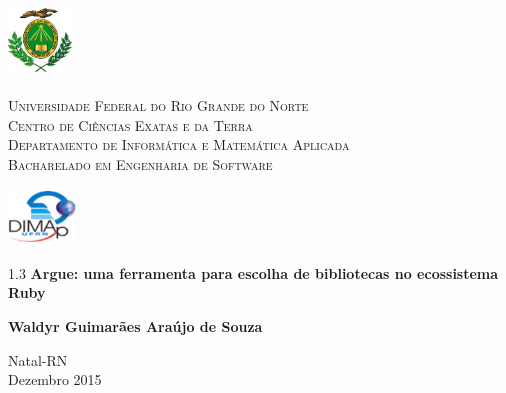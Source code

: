 
\begin{titlepage}
	\begin{center}
		
		\begin{minipage}{2cm}
			\begin{center}
				\includegraphics[width=1.7cm, height=2.0cm]{Imagens/Brasao-UFRN.jpg}
			\end{center}
		\end{minipage}
		\begin{minipage}{11cm}
			\begin{center}
				\begin{espacosimples}
					{\small \textsc{Universidade Federal do Rio Grande do Norte}			\\
							  \textsc{Centro de Ciências Exatas e da Terra}						\\
							  \textsc{Departamento de Informática e Matemática Aplicada}	\\
							  \textsc{Bacharelado em Engenharia de Software}}
				\end{espacosimples}
			\end{center}
		\end{minipage}
		\begin{minipage}{2cm}
			\begin{center}
				\includegraphics[width=1.8cm, height=1.5cm]{Imagens/Logotipo-DIMAp.jpg}
			\end{center}
		\end{minipage}
			
		\vspace{5cm}
						
		{\setlength{\baselineskip}%
		{1.3\baselineskip}
		{\LARGE \textbf{Argue: uma ferramenta para escolha de bibliotecas no ecossistema Ruby}}\par}
			
		\vspace{4cm}
			
		{\large \textbf{Waldyr Guimarães Araújo de Souza}}
						
		\vspace{7cm}
		
		Natal-RN\\Dezembro 2015
	\end{center}
\end{titlepage}